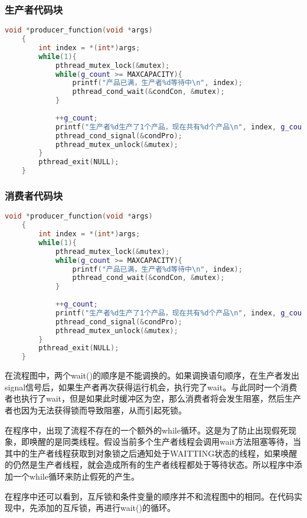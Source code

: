 \documentclass[withoutpreface,bwprint]{cumcmthesis} %
\begin{document}
\subsubsection*{生产者代码块}
\begin{lstlisting}[language=c++]
    void *producer_function(void *args)
    {
        int index = *(int*)args;
        while(1){
            pthread_mutex_lock(&mutex);
            while(g_count >= MAXCAPACITY){
                printf("产品已满，生产者%d等待中\n", index);
                pthread_cond_wait(&condCon, &mutex);
            }
     
            ++g_count;
            printf("生产者%d生产了1个产品，现在共有%d个产品\n", index, g_count);
            pthread_cond_signal(&condPro);
            pthread_mutex_unlock(&mutex);
        }
        pthread_exit(NULL);
    }
\end{lstlisting}

\subsubsection*{消费者代码块}
\begin{lstlisting}[language=c++]
    void *producer_function(void *args)
    {
        int index = *(int*)args;
        while(1){
            pthread_mutex_lock(&mutex);
            while(g_count >= MAXCAPACITY){
                printf("产品已满，生产者%d等待中\n", index);
                pthread_cond_wait(&condCon, &mutex);
            }
     
            ++g_count;
            printf("生产者%d生产了1个产品，现在共有%d个产品\n", index, g_count);
            pthread_cond_signal(&condPro);
            pthread_mutex_unlock(&mutex);
        }
        pthread_exit(NULL);
    }
\end{lstlisting}

在流程图中，两个wait()的顺序是不能调换的。如果调换语句顺序，在生产者发出signal信号后，如果生产者再次获得运行机会，执行完了wait。与此同时一个消费者也执行了wait，但是如果此时缓冲区为空，那么消费者将会发生阻塞，然后生产者也因为无法获得锁而导致阻塞，从而引起死锁。

在程序中，出现了流程不存在的一个额外的while循环。这是为了防止出现假死现象，即唤醒的是同类线程。假设当前多个生产者线程会调用wait方法阻塞等待，当其中的生产者线程获取到对象锁之后通知处于WAITTING状态的线程，如果唤醒的仍然是生产者线程，就会造成所有的生产者线程都处于等待状态。所以程序中添加一个while循环来防止假死的产生。

在程序中还可以看到，互斥锁和条件变量的顺序并不和流程图中的相同。在代码实现中，先添加的互斥锁，再进行wait()的循环。
\end{document}

